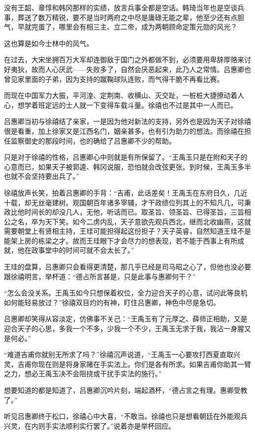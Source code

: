 没有王韶、章惇和韩冈那样的实绩，放言兵事全都是空话。韩琦当年也是空谈兵事，葬送了数万精锐，要不是当时两府之中尽是庸碌无能之辈，他至少还有点胆气，早就完蛋了，哪里会有相三主、立二帝，成为两朝顾命定策元勋的风光？

这也算是如今士林中的风气。

在过去，大宋坐拥百万大军却连御敌于国门之外都做不到，必须要用卑辞厚赂来讨好夷狄，故而人心厌武——失败多了，自然会厌恶起来，此乃人之常情。吕惠卿也曾见家里面的子弟，因为支持的蹴鞠球队连败，而气得干脆不再看比赛。

而现在中国军力大振，平河湟、定荆南、收横山、灭交趾，一桩桩大捷撩动着人心，想学着班定远的士人就一下变得车载斗量。徐禧也不过是其中一人而已。

吕惠卿当初与徐禧结了亲家，一是因为他对新法的支持，另外也是因为天子对徐禧很是看重，加上徐家又是江西名门，姻亲甚多，也有引为助力的想法。而徐禧在担任监察御史的那段时间，也的确给了吕惠卿不少的帮助。

只是对于徐禧的性格，吕惠卿心中则就是有所保留了。“王禹玉只是在附和天子的心意而已，如果天子被郭逵、韩冈说服，恐怕就会改弦更张。到时候，王禹玉多半也就不会坚持要出兵了。”

徐禧放声长笑，拍着吕惠卿的手背：“吉甫，此话差矣！王禹玉在东府日久，几近十载，却无丝毫建树。观国朝百年诸多宰辅，才干政绩位列其上的不知凡几，可秉政比他时间长的却没几人，无他，听话而已。取圣旨、领圣旨、已得圣旨，三旨相公之名，卒为天下笑。如今二虏内乱，天子意欲先观兵西北，继而北收幽燕，这就需要朝堂上有贤相主持，王珪可能担得起这份担子？天子英睿，自然知道王珪不是能架上房的栋梁之才。故而王珪眼下才会尽力的想表现，若不能于西事上有所成就，他在政事堂中的时间可就不会太长了。”

王珪的盘算，吕惠卿只会看得更清楚，那几乎已经是司马昭之心了，但他也没必要跟徐禧明言，举杯道：“德占所言甚是，只是此事与惠卿何干？”

“怎么会没关系。王禹玉如今只想保着权位，全力迎合天子的心意，试问此等良机如何能轻易放过？”徐禧双目灼灼有神，盯住吕惠卿，神色中尽是急切。

吕惠卿却笑得从容淡定，仿佛事不关己：“王禹玉有了元厚之、薛师正相助，又是迎合天子的心思，多我一个不多，少我一个不少，王禹玉无求于我，我沾一身腥又是何必。”

“难道吉甫你就别无所求了吗？”徐禧沉声说道，“王禹玉一心要攻打西夏直取兴灵，吉甫你现在则是将身家赌在手实法上。你们是各有所求。如果吉甫你助其一臂之力，想必王禹玉决不会阻挠或干扰手实法的施行。”

想要知道的都是知道了，吕惠卿沉吟片刻，端起酒杯，“德占言之有理。惠卿受教了。”

听见吕惠卿终于松口，徐禧心中大喜，“不敢当。徐禧也只是想看朝廷在外能观兵兴灵，在内则手实法顺利实行罢了。”说着亦是举杯回应。

